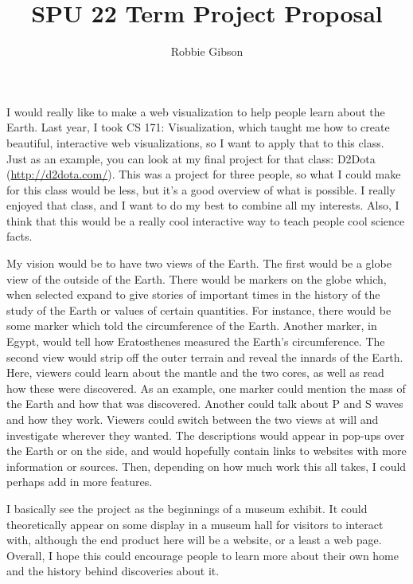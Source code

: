 \documentclass[11pt]{article}
\title{\TitleFont \textbf{SPU 22 Term Project Proposal}}
\author{\TitleFont Robbie Gibson}
\date{ }
\begin{document}
\maketitle

\vspace{-1.5cm}

\setlength{\parskip}{0.5em}

I would really like to make a web visualization to help people learn about the Earth.
Last year, I took CS 171: Visualization, which taught me how to create beautiful, interactive web visualizations, so I want to apply that to this class.
Just as an example, you can look at my final project for that class: D2Dota (\url{http://d2dota.com/}).
This was a project for three people, so what I could make for this class would be less, but it's a good overview of what is possible.
I really enjoyed that class, and I want to do my best to combine all my interests.
Also, I think that this would be a really cool interactive way to teach people cool science facts.

My vision would be to have two views of the Earth.
The first would be a globe view of the outside of the Earth.
There would be markers on the globe which, when selected expand to give stories of important times in the history of the study of the Earth or values of certain quantities.
For instance, there would be some marker which told the circumference of the Earth.
Another marker, in Egypt, would tell how Eratosthenes measured the Earth's circumference.
The second view would strip off the outer terrain and reveal the innards of the Earth.
Here, viewers could learn about the mantle and the two cores, as well as read how these were discovered.
As an example, one marker could mention the mass of the Earth and how that was discovered.
Another could talk about P and S waves and how they work.
Viewers could switch between the two views at will and investigate wherever they wanted.
The descriptions would appear in pop-ups over the Earth or on the side, and would hopefully contain links to websites with more information or sources.
Then, depending on how much work this all takes, I could perhaps add in more features.

I basically see the project as the beginnings of a museum exhibit.
It could theoretically appear on some display in a museum hall for visitors to interact with, although the end product here will be a website, or a least a web page.
Overall, I hope this could encourage people to learn more about their own home and the history behind discoveries about it.
\end{document}
